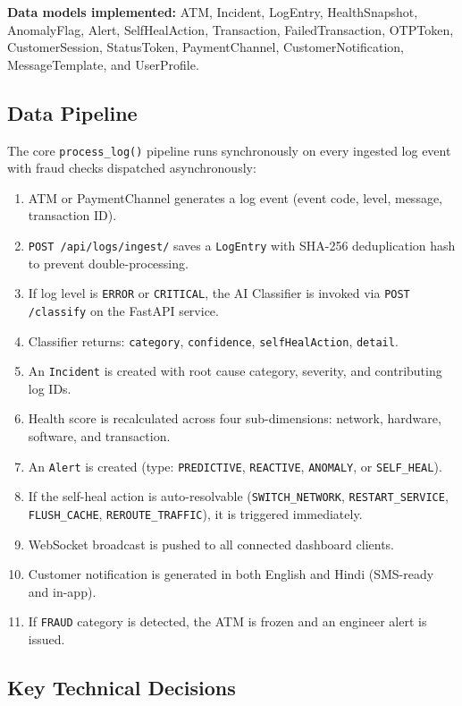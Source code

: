 \documentclass[11pt,a4paper]{article}
\begin{document}
\textbf{Data models implemented:} ATM, Incident, LogEntry, HealthSnapshot, AnomalyFlag, Alert, SelfHealAction, Transaction, FailedTransaction, OTPToken, CustomerSession, StatusToken, PaymentChannel, CustomerNotification, MessageTemplate, and UserProfile.

\subsection{Data Pipeline}

The core \texttt{process\_log()} pipeline runs synchronously on every ingested log event with fraud checks dispatched asynchronously:

\begin{enumerate}
  \item ATM or PaymentChannel generates a log event (event code, level, message, transaction ID).
  \item \texttt{POST /api/logs/ingest/} saves a \texttt{LogEntry} with SHA-256 deduplication hash to prevent double-processing.
  \item If log level is \texttt{ERROR} or \texttt{CRITICAL}, the AI Classifier is invoked via \texttt{POST /classify} on the FastAPI service.
  \item Classifier returns: \texttt{category}, \texttt{confidence}, \texttt{selfHealAction}, \texttt{detail}.
  \item An \texttt{Incident} is created with root cause category, severity, and contributing log IDs.
  \item Health score is recalculated across four sub-dimensions: network, hardware, software, and transaction.
  \item An \texttt{Alert} is created (type: \texttt{PREDICTIVE}, \texttt{REACTIVE}, \texttt{ANOMALY}, or \texttt{SELF\_HEAL}).
  \item If the self-heal action is auto-resolvable (\texttt{SWITCH\_NETWORK}, \texttt{RESTART\_SERVICE}, \texttt{FLUSH\_CACHE}, \texttt{REROUTE\_TRAFFIC}), it is triggered immediately.
  \item WebSocket broadcast is pushed to all connected dashboard clients.
  \item Customer notification is generated in both English and Hindi (SMS-ready and in-app).
  \item If \texttt{FRAUD} category is detected, the ATM is frozen and an engineer alert is issued.
\end{enumerate}

\subsection{Key Technical Decisions}
\end{document}
